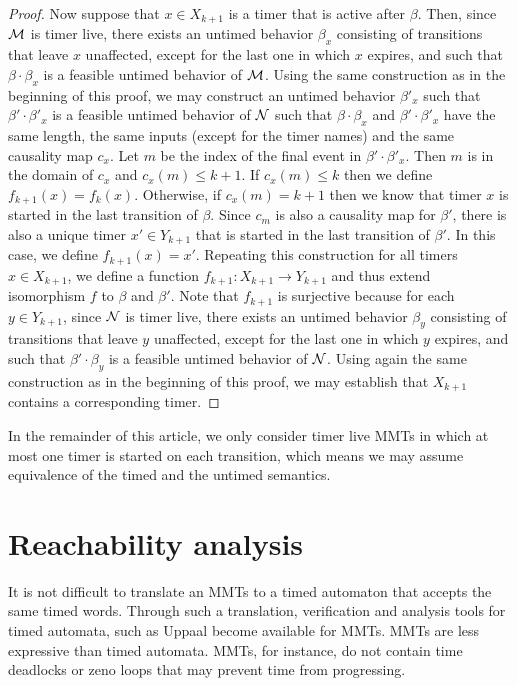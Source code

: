 \begin{proof}
Now suppose that $x \in X_{k+1}$ is a timer that is active after $\beta$.
Then, since ${\cal M}$ is timer live, there exists an untimed behavior $\beta_x$ consisting of transitions that leave $x$ unaffected, except for the last one in which $x$ expires, and such that $\beta \cdot \beta_x$ is a feasible untimed behavior of ${\cal M}$.
Using the same construction as in the beginning of this proof, we may construct an untimed behavior $\beta'_x$ such
that $\beta' \cdot \beta'_x$ is a feasible untimed behavior of ${\cal N}$ such that $\beta \cdot \beta_x$ and $\beta' \cdot \beta'_x$
have the same length, the same inputs (except for the timer names) and the same causality map $c_x$.
Let $m$ be the index of the final event in $\beta' \cdot \beta'_x$. Then $m$ is in the domain of $c_x$ and $c_x(m) \leq k+1$.
If $c_x(m) \leq k$ then we define $f_{k+1}(x) = f_k (x)$.
Otherwise, if $c_x(m) = k+1$ then we know that timer $x$ is started in the last transition of $\beta$.
Since $c_m$ is also a causality map for $\beta'$, there is also a unique timer $x' \in Y_{k+1}$ that is started in the last transition of $\beta'$.
In this case, we define $f_{k+1}(x) = x'$.
Repeating this construction for all timers $x \in X_{k+1}$, we define a function $f_{k+1} : X_{k+1} \rightarrow Y_{k+1}$ and thus
extend isomorphism $f$ to $\beta$ and $\beta'$.
Note that $f_{k+1}$ is surjective because for each $y \in Y_{k+1}$, since ${\cal N}$ is timer live,
there exists an untimed behavior $\beta_y$ consisting of transitions that leave $y$ unaffected, except for the last one in which $y$ expires, and such that $\beta' \cdot \beta_y$ is a feasible untimed behavior of ${\cal N}$.
Using again the same construction as in the beginning of this proof, we may establish that $X_{k+1}$ contains a corresponding timer. 
\end{proof}
\fi

In the remainder of this article, we only consider timer live MMTs in which at most one timer is started on each transition,
which means we may assume equivalence of the timed and the untimed semantics.

\iflong
\section{Reachability analysis}

It is not difficult to translate an MMTs to a timed automaton \cite{AD94,BengtssonY03} that accepts the same timed words.
Through such a translation, verification and analysis tools for timed automata, such as Uppaal \cite{Uppaal4.0}
become available for MMTs.
MMTs are less expressive than timed automata. MMTs, for instance, do not contain time deadlocks or zeno loops that
may prevent time from progressing.

